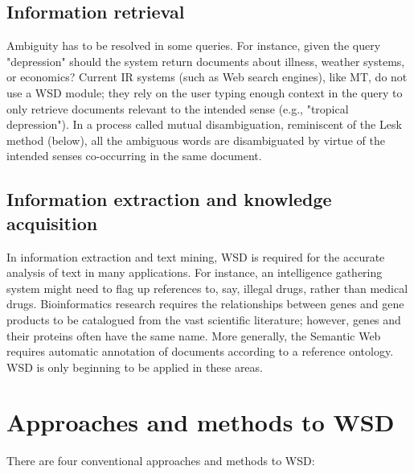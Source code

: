 \documentclass[11pt]{article}
\begin{document}
\nocite{Agirre04smoothingand,Fujii98corpus-basedword,Vickrey2005,}
\printbibliography
\endrefsection


\subsection{Information retrieval}

Ambiguity has to be resolved in some queries. For instance, given the query "depression" should the system return documents about illness, weather systems, or economics? Current IR systems (such as Web search engines), like MT, do not use a WSD module; they rely on the user typing enough context in the query to only retrieve documents relevant to the intended sense (e.g., "tropical depression"). In a process called mutual disambiguation, reminiscent of the Lesk method (below), all the ambiguous words are disambiguated by virtue of the intended senses co-occurring in the same document.

\nocite{Fujii98corpus-basedword,Liu:2005:WSD:1099554.1099696,Zouaghi:2012:CIR:2400491.2400493}
\printbibliography
\endrefsection



\subsection{Information extraction and knowledge acquisition}

In information extraction and text mining, WSD is required for the accurate analysis of text in many applications. For instance, an intelligence gathering system might need to flag up references to, say, illegal drugs, rather than medical drugs. Bioinformatics research requires the relationships between genes and gene products to be catalogued from the vast scientific literature; however, genes and their proteins often have the same name. More generally, the Semantic Web requires automatic annotation of documents according to a reference ontology. WSD is only beginning to be applied in these areas.

\nocite{Fujii98corpus-basedword,reyes2009word}
\printbibliography
\endrefsection



\section{Approaches and methods to WSD}

There are four conventional approaches and methods to WSD:
\end{document}
